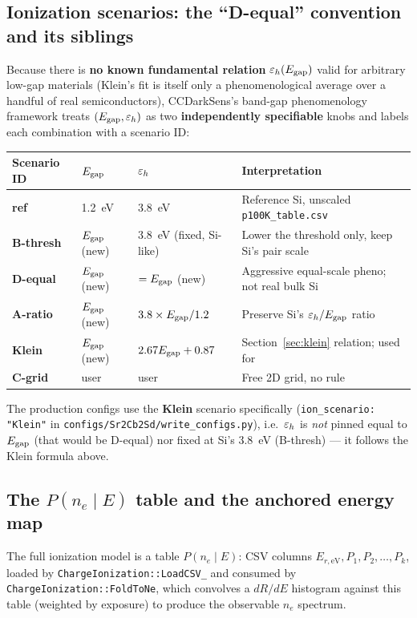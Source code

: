\subsection{Ionization scenarios: the ``D-equal'' convention and its siblings}

Because there is \textbf{no known fundamental relation} $\varepsilon_h(E_\mathrm{gap})$
valid for arbitrary low-gap materials (Klein's fit is itself only a
phenomenological average over a handful of real semiconductors),
CCDarkSens's band-gap phenomenology framework treats $(E_\mathrm{gap},\varepsilon_h)$ as
two \textbf{independently specifiable} knobs and labels each combination
with a scenario ID:

\begin{center}
\begin{tabular}{@{}p{2cm}p{2.7cm}p{3.6cm}p{5.5cm}@{}}
\toprule
Scenario ID & $E_\mathrm{gap}$ & $\varepsilon_h$ & Interpretation \\
\midrule
\textbf{ref} & 1.2~eV & 3.8~eV & Reference Si, unscaled \texttt{p100K\_table.csv} \\
\textbf{B-thresh} & $E_\mathrm{gap}$ (new) & 3.8~eV (fixed, Si-like) & Lower the threshold only, keep Si's pair scale \\
\textbf{D-equal} & $E_\mathrm{gap}$ (new) & $=E_\mathrm{gap}$ (new) & Aggressive equal-scale pheno; not real bulk Si \\
\textbf{A-ratio} & $E_\mathrm{gap}$ (new) & $3.8\times E_\mathrm{gap}/1.2$ & Preserve Si's $\varepsilon_h/E_\mathrm{gap}$ ratio \\
\textbf{Klein} & $E_\mathrm{gap}$ (new) & $2.67E_\mathrm{gap}+0.87$ & Section~\ref{sec:klein} relation; used for \SrCdSb{} \\
\textbf{C-grid} & user & user & Free 2D grid, no rule \\
\bottomrule
\end{tabular}
\end{center}

The \SrCdSb{} production configs use the \textbf{Klein} scenario
specifically (\texttt{ion\_scenario: "Klein"} in
\texttt{configs/Sr2Cb2Sd/write\_configs.py}), i.e.\ $\varepsilon_h$ is
\emph{not} pinned equal to $E_\mathrm{gap}$ (that would be D-equal) nor fixed at
Si's 3.8~eV (B-thresh) — it follows the Klein formula above.

\subsection{The $P(n_e\mid E)$ table and the anchored energy map}
\label{sec:pne-table}

The full ionization model is a table $P(n_e\mid E)$: CSV columns
$E_{r,\mathrm{eV}}, P_1, P_2, \ldots, P_k$, loaded by
\texttt{ChargeIonization::LoadCSV\_} and consumed by
\texttt{ChargeIonization::FoldToNe}, which convolves a $dR/dE$ histogram
against this table (weighted by exposure) to produce the observable $n_e$
spectrum.

